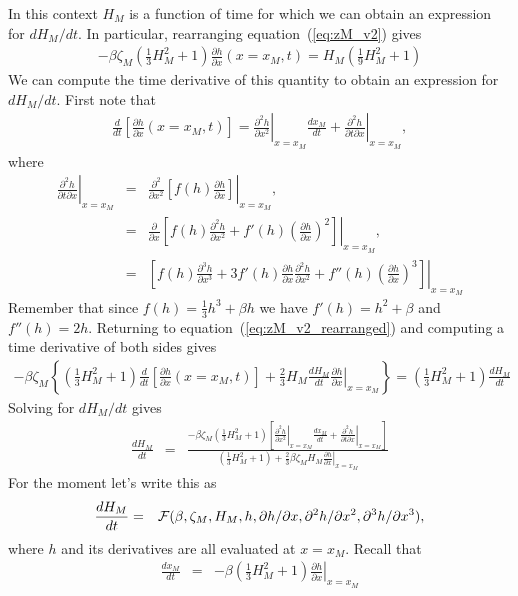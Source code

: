 \documentclass[11pt]{article}
\newcommand{\bea}{\begin{eqnarray}}
\newcommand{\eea}{\end{eqnarray}}
\begin{document}
In this context $H_M$ is a function of time for which we can obtain an expression for $dH_M/dt$.   In particular, rearranging equation~(\ref{eq:zM_v2}) gives
\bea
\label{eq:zM_v2_rearranged}
-\beta \zeta_M \left( \frac{1}{3} H_M^2 + 1 \right) \frac{\partial h}{\partial x}(x=x_M,t) = H_M \left( \frac{1}{9} H_M^2 + 1 \right)
\eea
We can compute the time derivative of this quantity to obtain an expression for $dH_M/dt$.  First note that
\bea
\frac{d}{dt} \left[ \frac{\partial h}{\partial x}(x=x_M,t) \right] = \left. \frac{\partial^2 h}{\partial x^2} \right|_{x=x_M} \frac{dx_M}{dt} + \left. \frac{\partial^2 h}{\partial t \partial x} \right|_{x=x_M},
\eea
where
\bea
\left. \frac{\partial^2 h}{\partial t \partial x} \right|_{x=x_M} & = & \left. \frac{\partial^2}{\partial x^2} \left[ f(h) \frac{\partial h}{\partial x} \right] \right|_{x=x_M},\\
 & = & \left. \frac{\partial}{\partial x} \left[ f(h) \frac{\partial^2 h}{\partial x^2} + f'(h) \left( \frac{\partial h}{\partial x} \right)^2 \right]\right|_{x=x_M},\\
  & = & \left. \left[ f(h) \frac{\partial^3 h}{\partial x^3} + 3 f'(h) \frac{\partial h}{\partial x} \frac{\partial^2 h}{\partial x^2} + f''(h) \left( \frac{\partial h}{\partial x} \right)^3 \right]\right|_{x=x_M}
\eea
Remember that since $f(h) = \frac{1}{3} h^3 + \beta h$ we have $f'(h) = h^2 + \beta$ and $f''(h) = 2h$.
Returning to equation~(\ref{eq:zM_v2_rearranged}) and computing a time derivative of both sides gives
\bea
-\beta \zeta_M \left\{ \left( \frac{1}{3} H_M^2 + 1 \right) \frac{d}{dt} \left[ \frac{\partial h}{\partial x}(x=x_M,t) \right] + \frac{2}{3} H_M \frac{dH_M}{dt} \left. \frac{\partial h}{\partial x}\right|_{x=x_M} \right\}
 = \left( \frac{1}{3} H_M^2 + 1 \right) \frac{dH_M}{dt}
\eea
Solving for $dH_M/dt$ gives
\bea
\frac{dH_M}{dt} & = & \frac{-\beta \zeta_M \left( \frac{1}{3} H_M^2 + 1 \right) \left[ \left. \frac{\partial^2 h}{\partial x^2} \right|_{x=x_M} \frac{dx_M}{dt} + \left. \frac{\partial^2 h}{\partial t \partial x} \right|_{x=x_M}\right] }{\left( \frac{1}{3} H_M^2 + 1 \right) + \frac{2}{3} \beta \zeta_M H_M  \left. \frac{\partial h}{\partial x}\right|_{x=x_M} }
\eea
For the moment let's write this as
\bea
\frac{dH_M}{dt} & = & {\cal F}(\beta,\zeta_M,H_M,h,\partial h/\partial x, \partial^2 h/\partial x^2 , \partial^3 h/\partial x^3),
\eea
where $h$ and its derivatives are all evaluated at $x=x_M$.
Recall that
\bea
\frac{dx_M}{dt} & = & - \beta \left( \frac{1}{3} H^2_M + 1 \right) \left. \frac{\partial h}{\partial x} \right|_{x=x_M}
\eea
\end{document}
